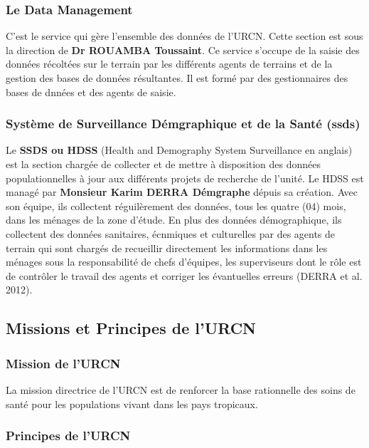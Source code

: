 \documentclass[12pt]{report}
\begin{document}
				\subsubsection{Le Data Management}
				
				C'est le service qui gère l'ensemble des données de l'URCN. Cette section est sous la direction de \textbf{Dr ROUAMBA Toussaint}. Ce service s'occupe de la saisie des données récoltées sur le terrain par les différents agents de terrains et de la gestion des bases de données résultantes. Il est formé par des gestionnaires des bases de dnnées et des agents de saisie.
				
				\subsubsection{Système de Surveillance Démgraphique et de la Santé (\gls{ssds})}
				
				Le \textbf{SSDS ou HDSS} (Health and Demography System Surveillance en anglais) est la section chargée de collecter et de mettre à disposition des données populationnelles à jour aux différents projets de recherche de l'unité. Le HDSS est managé par \textbf{Monsieur Karim DERRA Démgraphe} dépuis sa création. Avec son équipe, ils collectent réguilèrement des données, tous les quatre (04) mois, dans les ménages de la zone d'étude. En plus des données démographique, ils collectent des données sanitaires, écnmiques et culturelles par des agents de terrain qui sont chargés de recueillir directement les informations dans les ménages sous la responsabilité de chefs d'équipes, les superviseurs dont le rôle est de contrôler le travail des agents et corriger les  évantuelles erreurs (DERRA et al. 2012).
				
			\subsection{Missions et Principes de l'URCN}
				\subsubsection{Mission de l'URCN}
				
				La mission directrice de l'URCN est de renforcer la base rationnelle des soins de santé pour les populations vivant dans les pays tropicaux.
				
				\subsubsection{Principes de l'URCN}
				
				
				
			
	
		\tableofcontents              %
\end{document}
